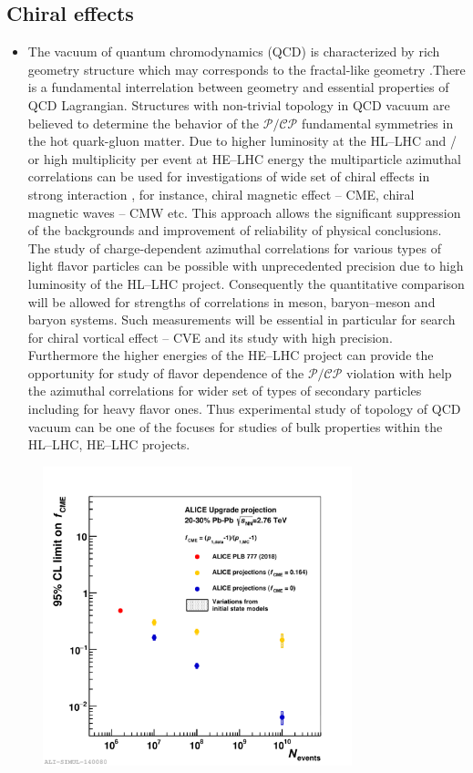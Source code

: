 \subsection{Chiral effects}

\begin{itemize}
	\item
The vacuum of quantum chromodynamics (QCD) is characterized by rich geometry structure which may corresponds to the fractal-like geometry \cite{IJMPE-22-1350041-2013}.There is a fundamental interrelation between geometry and essential properties of QCD Lagrangian.
Structures with non-trivial topology in QCD vacuum are believed to determine the behavior of the $\mathcal{P / CP}$ fundamental symmetries in the hot quark-gluon matter. Due to higher luminosity at the HL--LHC and / or high multiplicity per event at HE--LHC energy the multiparticle azimuthal correlations can be used for investigations of wide set of chiral effects in strong interaction \cite{PAN-80-1133-2017}, for instance, chiral magnetic effect -- CME, chiral magnetic waves -- CMW etc. This approach  allows the significant suppression of the backgrounds and improvement of reliability of physical conclusions. The study of charge-dependent azimuthal correlations for various types of light flavor particles can be possible with unprecedented precision due to high luminosity of the HL--LHC project. Consequently the quantitative comparison will be allowed for strengths of correlations in meson, baryon--meson and baryon systems. Such measurements will be essential in particular for search for chiral vortical effect -- CVE and its study with high precision. Furthermore the higher energies of the HE--LHC project can provide the opportunity for study of flavor dependence of the $\mathcal{P / CP}$ violation with help the azimuthal correlations for wider set of types of secondary particles including for heavy flavor ones. Thus experimental study of topology of QCD vacuum can be one of the focuses for studies of bulk properties within the HL--LHC, HE--LHC projects.
\end{itemize}



\begin{figure}[!htb]
\begin{center}
\includegraphics[width=0.8\textwidth]{figs/alice_projection_fcme}
\caption{
}
\label{fig:alice_fcme}
\end{center}
\end{figure}

